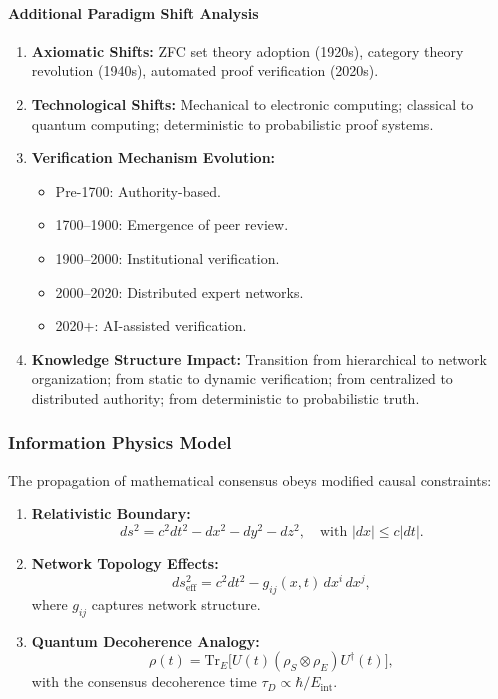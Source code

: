 \documentclass[11pt]{article}
\begin{document}
\paragraph{Additional Paradigm Shift Analysis}
\begin{enumerate}[label=(\arabic*)]
    \item \textbf{Axiomatic Shifts:} ZFC set theory adoption (1920s), category theory revolution (1940s), automated proof verification (2020s).
    \item \textbf{Technological Shifts:} Mechanical to electronic computing; classical to quantum computing; deterministic to probabilistic proof systems.
    \item \textbf{Verification Mechanism Evolution:}
    \begin{itemize}
        \item Pre-1700: Authority-based.
        \item 1700--1900: Emergence of peer review.
        \item 1900--2000: Institutional verification.
        \item 2000--2020: Distributed expert networks.
        \item 2020+: AI-assisted verification.
    \end{itemize}
    \item \textbf{Knowledge Structure Impact:} Transition from hierarchical to network organization; from static to dynamic verification; from centralized to distributed authority; from deterministic to probabilistic truth.
\end{enumerate}

\subsubsection{Information Physics Model}

The propagation of mathematical consensus obeys modified causal constraints:
\begin{enumerate}[label=(\arabic*)]
    \item \textbf{Relativistic Boundary:}
    \[
    ds^2 = c^2dt^2 - dx^2 - dy^2 - dz^2, \quad \text{with } |dx| \leq c|dt|.
    \]
    \item \textbf{Network Topology Effects:}
    \[
    ds^2_{\text{eff}} = c^2dt^2 - g_{ij}(x,t)\,dx^i\,dx^j,
    \]
    where $g_{ij}$ captures network structure.
    \item \textbf{Quantum Decoherence Analogy:}
    \[
    \rho(t)=\text{Tr}_E\bigl[U(t)(\rho_S\otimes\rho_E)U^\dagger(t)\bigr],
    \]
    with the consensus decoherence time $\tau_D\propto \hbar/E_{\text{int}}$.
\end{enumerate}
\end{document}
